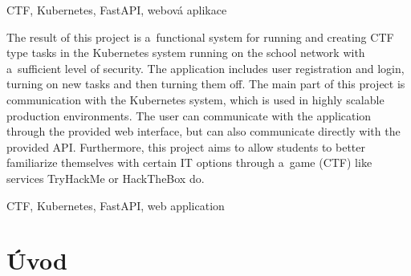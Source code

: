 \documentclass[12pt, a4paper,
oneside,      %
openright
]{report}
\begin{document}
	\vspace{18pt}
	
	
	\noindent CTF, Kubernetes, FastAPI, webová aplikace
	
	\vspace{18pt}

	
	\noindent The result of this project is a~functional system for running and creating CTF type tasks in the Kubernetes system running on the school network with a~sufficient level of security. The application includes user registration and login, turning on new tasks and then turning them off. The main part of this project is communication with the Kubernetes system, which is used in highly scalable production environments. The user can communicate with the application through the provided web interface, but can also communicate directly with the provided API. Furthermore, this project aims to allow students to better familiarize themselves with certain IT options through a~game (CTF) like services TryHackMe or HackTheBox do.

	
	\vspace{18pt}
	
	
	\noindent CTF, Kubernetes, FastAPI, web application	
	\clearpage %

	
	\tableofcontents %

	\setcounter{page}{1} %

	\pagestyle{plain}
	\chapter*{Úvod}
\end{document}
